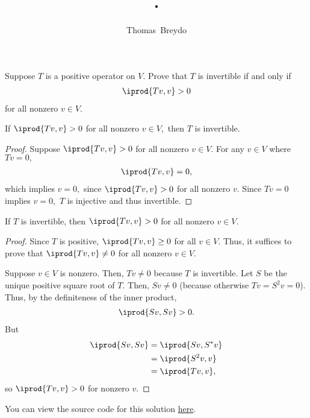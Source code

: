 \documentclass{amsart}
\title{\pagenum.\probnum}
\author{Thomas\ Breydo}
\newcommand{\pagenum}{232}
\newcommand{\probnum}{7}
\begin{document}
\maketitle

\begin{problem*}
Suppose $T$ is a positive operator on $V.$ Prove that $T$ 
is invertible if and only if
\begin{align*}
    \iprod{Tv,v}>0
\end{align*}
for all nonzero $v\in V.$
\end{problem*}

\vspace{0.5in}

\begin{claim*}
If $\iprod{Tv,v}>0$ for all nonzero $v\in V,$
then $T$ is invertible.
\end{claim*}
\begin{proof}
Suppose $\iprod{Tv,v}>0$ for all nonzero $v\in V.$
For any $v\in V$ where $Tv=0,$
\begin{align*}
\iprod{Tv,v}=0,
\end{align*}
which implies $v=0,$ since $\iprod{Tv,v}>0$ for all nonzero $v.$ 
Since $Tv=0$ implies $v=0,$ $T$ is injective and
thus invertible.
\end{proof}

\begin{claim*}
If $T$ is invertible, then $\iprod{Tv,v}>0$ for all nonzero
$v\in V.$
\end{claim*}
\begin{proof}
Since $T$ is positive, $\iprod{Tv,v}\ge0$ for all $v\in V.$
Thus, it suffices
to prove that $\iprod{Tv,v}\ne0$ for all nonzero $v\in V.$

Suppose $v\in V$ is nonzero.
Then, $Tv\ne 0$ because $T$ is invertible.
Let $S$ be the unique positive square root of $T.$
Then, $Sv\ne 0$ (because otherwise $Tv=S^2v=0$).
Thus, by the definiteness of the inner product,
\begin{align*}
    \iprod{Sv,Sv}>0.
\end{align*}
But
\begin{align*}
    \iprod{Sv,Sv} &= \iprod{Sv,S^*v} \\
                  &= \iprod{S^2v,v} \\
                  &= \iprod{Tv,v}, 
\end{align*}
so $\iprod{Tv,v}>0$ for nonzero $v.$
\end{proof}

\vspace{0.5in}

\begin{note*}
You can view the source code for this solution
\href{https://github.com/thomasbreydo/linalg/blob/main/\pagenum_\probnum_Thomas_Breydo.tex}
{here}.
\end{note*}
\end{document}
